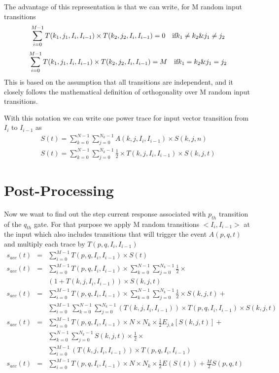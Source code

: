 \documentclass[a4]{IEEEtran}
\begin{document}
The advantage of this representation is that we can write, for M random input transitions
\begin{displaymath}
\sum_{i=0}^{M-1} T(k_1,j_1,I_i,I_{i-1}) \times T(k_2,j_2,I_i,I_{i-1}) = 0 \\
											\quad\textrm{if}  k_1 \neq k_2 \& j_1 \neq j_2
\end{displaymath}
\begin{displaymath}
\sum_{i=0}^{M-1} T(k_1,j_1,I_i,I_{i-1}) \times T(k_2,j_2,I_i,I_{i-1}) = M \\
										\quad	\textrm{if}  k_1 =  k_2 \& j_1 = j_2
\end{displaymath}
This is based on the assumption that all transitions are independent, and it closely follows the mathematical
definition of orthogonality over M random input transitions.

With this notation we can write one power trace for input vector transition from $I_i$ to $I_{i-1}$ as 
\begin{eqnarray}
\label{eq:1}
S(t)= \sum_{k=0}^{N-1} \sum_{j=0}^{N_k-1} A(k,j,I_i,I_{i-1}) \times S(k,j,n)\\
S(t)= \sum_{k=0}^{N-1} \sum_{j=0}^{N_k-1} \frac{1}{2} \times T(k,j,I_i,I_{i-1}) \times S(k,j,t)
\end{eqnarray}



\section{Post-Processing}
Now we want to find out the step current response associated with $p_{th}$ transition of the $q_{th}$ gate. For that purpose we 
apply M random transitions $<I_i,I_{i-1}>$ at the input which also includes transitions that will trigger the event $A(p,q,t)$ 
and multiply each trace by $T(p,q,I_i,I_{i-1})$
\small
\begin{eqnarray*}
s_{acc}(t) & = & \sum_{i=0}^{M-1} T(p,q,I_i,I_{i-1}) \times S(t) \\
s_{acc}(t) & = & \sum_{i=0}^{M-1} T(p,q,I_i,I_{i-1}) \times \sum_{k=0}^{N-1} \sum_{j=0}^{N_k-1} \frac{1}{2} \times {}
	\\
	& &{}(1+T(k,j,I_i,I_{i-1})) \times S(k,j,t) \\
s_{acc}(t) & = & \sum_{i=0}^{M-1} T(p,q,I_i,I_{i-1}) \times \sum_{k=0}^{N-1} \sum_{j=0}^{N_k-1} \frac{1}{2} \times S(k,j,t)+ {}
	\\
	& & {}  \sum_{i=0}^{M-1} \sum_{k=0}^{N-1} \sum_{j=0}^{N_k-1} (T(k,j,I_i,I_{i-1})) \times T(p,q,I_i,I_{i-1}) \times S(k,j,t) \\
s_{acc}(t) & = & \sum_{i=0}^{M-1} T(p,q,I_i,I_{i-1}) \times N \times N_k \times \frac{1}{2} E_{j,k}[S(k,j,t)]+ {}
	\\
	& & {}  \sum_{k=0}^{N-1} \sum_{j=0}^{N_k-1} S(k,j,t) \times  \frac{1}{2} \times {}\\
	& & {}  \sum_{i=0}^{M-1} (T(k,j,I_i,I_{i-1})) \times T(p,q,I_i,I_{i-1}) \\
s_{acc}(t) & = & \sum_{i=0}^{M-1} T(p,q,I_i,I_{i-1}) \times N \times N_k \times \frac{1}{2} E(S(t)) + \frac{M}{2} S(p,q,t)
\end{eqnarray*}
\normalsize
\end{document}
